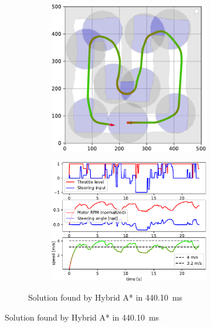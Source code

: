 \begin{figure}[!tbp]%
	\centering
	
	\begin{subfigure}[t]{\textwidth}
		\begin{subfigure}[c]{0.49\textwidth}
			\includegraphics[width=\textwidth]{../img/experiments/u_hybrid_astar_trajectory}
		\end{subfigure}
		\hfill
		\begin{subfigure}[c]{0.49\textwidth}
			\includegraphics[width=\textwidth]{../img/experiments/u_hybrid_astar_actuators}
		\end{subfigure}	
		\caption{Solution found by Hybrid A* in \SI{440.10}{\milli\second}}
		\label{fig:u-hybrid_astar}
	\end{subfigure}
	

\end{figure}
